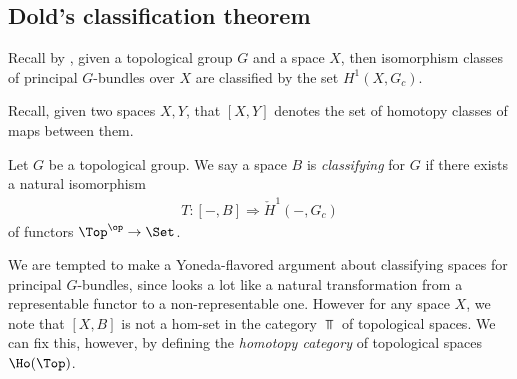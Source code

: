 \documentclass[11pt]{book}
\begin{document}
\subsection{Dold's classification theorem}

Recall by , given a topological group $G$ and a space $X$, then isomorphism classes of principal $G$-bundles over $X$ are classified by the set $H^1(X,G_c)$.

\begin{notation} Recall, given two spaces $X,Y$, that $[X,Y]$ denotes the set of homotopy classes of maps between them.
\end{notation}

\begin{definition}
\label{def:classifying-space}
Let $G$ be a topological group. We say a space $B$ is \emph{classifying} for $G$ if there exists a natural isomorphism
\begin{equation}\label{eqn:dold-classifying-nat-trans}
\begin{aligned}
    T \colon [-,B] \Rightarrow \check{H}^1(-,G_c)
\end{aligned}
\end{equation}
of functors $\Top^\op \to \Set$.
\end{definition}

\begin{remark} We are tempted to make a Yoneda-flavored argument about classifying spaces for principal $G$-bundles, since  looks a lot like a natural transformation from a representable functor to a non-representable one. However for any space $X$, we note that $[X,B]$ is not a hom-set in the category $\Top$ of topological spaces. We can fix this, however, by defining the \emph{homotopy category} of topological spaces $\Ho(\Top)$.
\end{remark}
\end{document}
